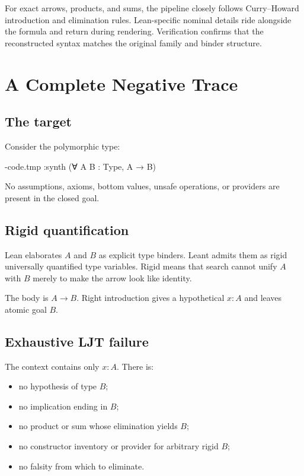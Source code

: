\documentclass[10pt,letterpaper,oneside,openany]{report}
\newcommand{\CodeTitle}{Lean}
\newenvironment{leanblock}[1][Lean]
  {\def\CodeTitle{#1}\VerbatimEnvironment\begin{VerbatimOut}{\jobname-code.tmp}}
  {\end{VerbatimOut}
   \begin{tcolorbox}[colback=CodeBack,colframe=Rule,colbacktitle=SageDark,title={\CodeTitle},
     sharp corners=south,breakable=false]
   \VerbatimInput[fontsize=\small,breaklines=true,breakanywhere=true,tabsize=2]{\jobname-code.tmp}
   \end{tcolorbox}}
\begin{document}
\begin{recapbox}
For exact arrows, products, and sums, the pipeline closely follows Curry--Howard introduction and elimination rules.  Lean-specific nominal details ride alongside the formula and return during rendering.  Verification confirms that the reconstructed syntax matches the original family and binder structure.
\end{recapbox}

\chapter{A Complete Negative Trace}\label{ch:worked-negative}

\section{The target}

Consider the polymorphic type:

\begin{leanblock}[Leant query]
:synth (∀ A B : Type, A → B)
\end{leanblock}

No assumptions, axioms, bottom values, unsafe operations, or providers are present in the closed goal.

\section{Rigid quantification}

Lean elaborates $A$ and $B$ as explicit type binders.  Leant admits them as rigid universally quantified type variables.  Rigid means that search cannot unify $A$ with $B$ merely to make the arrow look like identity.

The body is $A\to B$.  Right introduction gives a hypothetical $x:A$ and leaves atomic goal $B$.

\section{Exhaustive LJT failure}

The context contains only $x:A$.  There is:

\begin{itemize}
\item no hypothesis of type $B$;
\item no implication ending in $B$;
\item no product or sum whose elimination yields $B$;
\item no constructor inventory or provider for arbitrary rigid $B$;
\item no falsity from which to eliminate.
\end{itemize}
\end{document}
